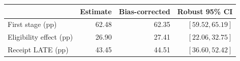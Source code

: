\begin{center}
\small\renewcommand{\arraystretch}{1.3}
\begin{tabular}{@{}lrrr@{}}\toprule
 & Estimate & Bias-corrected & Robust 95\% CI\\\midrule
First stage (pp) & 62.48 & 62.35 & $[59.52, 65.19]$\\
Eligibility effect (pp) & 26.90 & 27.41 & $[22.06, 32.75]$\\
Receipt LATE (pp) & 43.45 & 44.51 & $[36.60, 52.42]$\\
\bottomrule\end{tabular}
\end{center}
